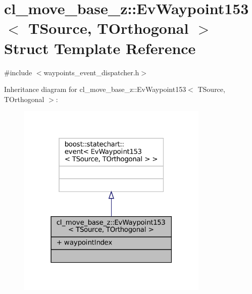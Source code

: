\hypertarget{structcl__move__base__z_1_1EvWaypoint153}{}\section{cl\+\_\+move\+\_\+base\+\_\+z\+:\+:Ev\+Waypoint153$<$ T\+Source, T\+Orthogonal $>$ Struct Template Reference}
\label{structcl__move__base__z_1_1EvWaypoint153}


{\ttfamily \#include $<$waypoints\+\_\+event\+\_\+dispatcher.\+h$>$}



Inheritance diagram for cl\+\_\+move\+\_\+base\+\_\+z\+:\+:Ev\+Waypoint153$<$ T\+Source, T\+Orthogonal $>$\+:
\nopagebreak
\begin{figure}[H]
\begin{center}
\leavevmode
\includegraphics[width=259pt]{structcl__move__base__z_1_1EvWaypoint153__inherit__graph}
\end{center}
\end{figure}


